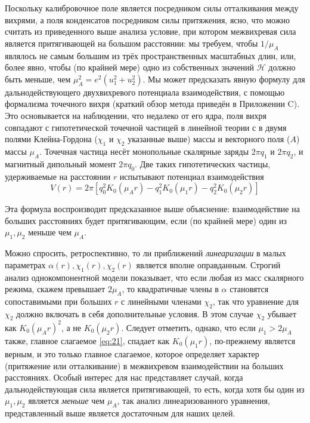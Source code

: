 Поскольку калибровочное поле является посредником силы отталкивания между 
вихрями, а поля конденсатов посредником силы притяжения, ясно, что можно 
считать из приведенного выше анализа условие, при котором межвихревая сила 
является притягивающей на большом расстоянии: мы требуем, чтобы \( 1/\mu_A \) 
являлось не самым большим из трёх пространственных масштабных длин, или, 
более явно, чтобы (по крайней мере) одно из собственных значений 
\( \mathcal{H} \) должно быть меньше, чем \( \mu_A^2 = e^2(u_1^2 + u_2^2) \). 
Мы может предсказать явную формулу для дальнодействующего двухвихревого 
потенциала взаимодействия, с помощью формализма точечного вихря \cite{bib:19} 
(краткий обзор метода приведён в Приложении C). Это основывается на 
наблюдении, что недалеко от его ядра, поля вихря совпадают с гипотетической 
точечной частицей в линейной теории с в двумя полями Клейна-Гордона 
(\( \chi_1 \) и \( \chi_2 \) указанные выше) массы и векторного поля (\( A \)) 
массы \( \mu_A \). Точечная частица несёт монопольные скалярные заряды 
\( 2\pi q_1 \) и \( 2\pi q_2 \), и магнитный дипольный момент \( 2\pi q_0 \). 
Две таких гипотетических частицы, удерживаемые на расстоянии \( r \) 
испытывают потенциал взаимодействия
\begin{equation}
    V(r) = 2\pi\left[ q_0^2 K_0(\mu_A r) - q_1^2 K_0(\mu_1 r) - 
        q_2^2 K_0(\mu_2 r) \right]
    \label{eq:22}
\end{equation}

Эта формула воспроизводит предсказанное выше объяснение: взаимодействие на 
больших расстояниях будет притягивающим, если (по крайней мере) один из 
\( \mu_1, \mu_2 \) меньше чем \( \mu_A \). 

Можно спросить, ретроспективно, то ли приближений \textit{линеаризации} в 
малых параметрах \( \alpha(r), \chi_1(r), \chi_2(r) \) является вполне 
оправданным. Строгий анализ однокомпонентной модели \cite{bib:20} показывает, 
что если любая из масс скалярного режима, скажем превышает \( 2\mu_A \), то 
квадратичные члены в \( \alpha \) становятся сопоставимыми при больших \( r \) 
с линейными членами \( \chi_2 \), так что уравнение для \( \chi_2 \) должно 
включать в себя дополнительные условия. В этом случае \( \chi_2 \) убывает как 
\( K_0(\mu_A r)^2 \), а не \( K_0(\mu_2 r) \). Следует отметить, однако, что 
если \( \mu_1 > 2\mu_A \) также, главное слагаемое \eqref{eq:21}, спадает как 
\( K_0(\mu_1 r) \), по-прежнему является верным, и это только главное 
слагаемое, которое определяет характер (притяжение или отталкивание) в 
межвихревом взаимодействии на больших расстояниях. Особый интерес для нас 
представляет случай, когда дальнодействующая сила является притягивающей, то 
есть, когда хотя бы один из \( \mu_1, \mu_2 \) является \textit{меньше} чем 
\( \mu_A \), так анализ линеаризованного уравнения, представленный выше 
является достаточным для наших целей.\cite{bib:main}

\newpage